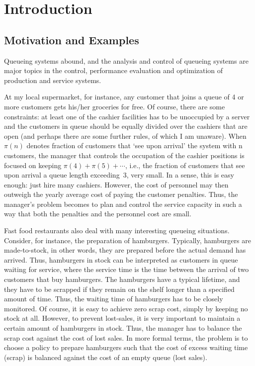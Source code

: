 \documentclass[companion]{subfiles}
\begin{document}
\section{Introduction}
\subsection*{Motivation and Examples}
Queueing systems abound, and the analysis and control of queueing systems are major topics in the control, performance evaluation and optimization of production and service systems.


At my local supermarket, for instance, any customer that joins a queue of 4 or more customers gets his/her groceries for free.
Of course, there are some constraints: at least one of the cashier facilities has to be unoccupied by a server and the customers in queue should be equally divided over the cashiers that are open (and perhaps there are some further rules, of which I am unaware).
When $\pi(n)$ denotes fraction of customers that `see upon arrival' the system with n customers, the manager that controls the occupation of the cashier positions is focused on keeping $\pi(4)+\pi(5)+\cdots$, i.e., the fraction of customers that see upon arrival a queue length exceeding~3, very small.
In a sense, this is easy enough: just hire many cashiers.
However, the cost of personnel may then outweigh the yearly average cost of paying the customer penalties.
Thus, the manager's problem becomes to plan and control the service capacity in such a way that both the penalties and the personnel cost are small.

Fast food restaurants also deal with many interesting queueing situations.
Consider, for instance, the preparation of hamburgers.
Typically, hamburgers are made-to-stock, in other words, they are prepared before the actual demand has arrived.
Thus, hamburgers in stock can be interpreted as customers in queue waiting for service, where the service time is the time between the arrival of two customers that buy hamburgers.
The hamburgers have a typical lifetime, and they have to be scrapped if they remain on the shelf longer than a specified amount of time.
Thus, the waiting time of hamburgers has to be closely monitored.
Of course, it is easy to achieve zero scrap cost, simply by keeping no stock at all.
However, to prevent lost-sales, it is very important to maintain a certain amount of hamburgers in stock.
Thus, the manager has to balance the scrap cost against the cost of lost sales.
In more formal terms, the problem is to choose a policy to prepare hamburgers such that the cost of excess waiting time (scrap) is balanced against the cost of an empty queue (lost sales).
\end{document}
